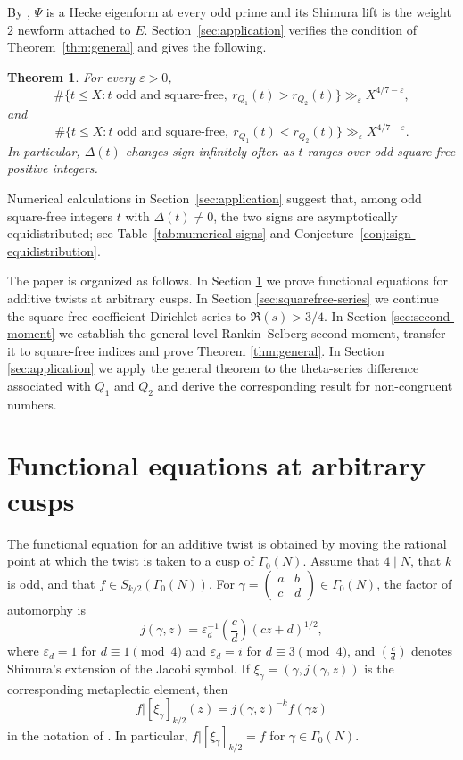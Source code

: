 \documentclass[11pt]{amsart}
\newtheorem{theorem}{Theorem}[section]
\theoremstyle{remark}
\begin{document}
By \cite{Qin}, $\Psi$ is a Hecke eigenform at every odd prime and its
Shimura lift is the weight $2$ newform attached to $E$.
Section~\ref{sec:application} verifies the condition of Theorem~\ref{thm:general} and gives the following.

\begin{theorem}\label{thm:quadratic}
For every $\varepsilon>0$,
\[
\#\{t\le X:t\text{ odd and square-free},\ r_{Q_1}(t)>r_{Q_2}(t)\}
\gg_\varepsilon X^{4/7-\varepsilon},
\]
and
\[
\#\{t\le X:t\text{ odd and square-free},\ r_{Q_1}(t)<r_{Q_2}(t)\}
\gg_\varepsilon X^{4/7-\varepsilon}.
\]
In particular, $\Delta(t)$ changes sign infinitely often as $t$ ranges over
odd square-free positive integers.
\end{theorem}

Numerical calculations in Section~\ref{sec:application} suggest that,
among odd square-free integers $t$ with $\Delta(t)\ne0$, the two signs are
asymptotically equidistributed; see Table~\ref{tab:numerical-signs} and
Conjecture~\ref{conj:sign-equidistribution}.

The paper is organized as follows. In Section \ref{sec:functional} we prove functional equations for additive twists at arbitrary cusps. In Section \ref{sec:squarefree-series} we continue the square-free coefficient Dirichlet series to $\Re(s)>3/4$. In Section \ref{sec:second-moment} we establish the general-level Rankin--Selberg second moment, transfer it to square-free indices and prove Theorem \ref{thm:general}. In Section \ref{sec:application} we apply the general theorem to the theta-series difference associated with $Q_1$ and $Q_2$ and derive the corresponding result for non-congruent numbers.

\section{Functional equations at arbitrary cusps}\label{sec:functional}
The functional equation for an additive twist is obtained by moving the
rational point at which the twist is taken to a cusp of $\Gamma_0(N)$.
 Assume that
$4\mid N$, that $k$ is odd, and that $f\in S_{k/2}(\Gamma_0(N))$. For
$\gamma=\begin{pmatrix}a&b\\c&d\end{pmatrix}\in\Gamma_0(N)$, the factor of
automorphy is
\[
j(\gamma,z)=\varepsilon_d^{-1}\left(\frac cd\right)(cz+d)^{1/2},
\]
where $\varepsilon_d=1$ for $d\equiv1\pmod4$ and $\varepsilon_d=i$ for
$d\equiv3\pmod4$, and $\left(\frac cd\right)$ denotes Shimura's extension
of the Jacobi symbol. If $\xi_\gamma=(\gamma,j(\gamma,z))$ is the
corresponding metaplectic element, then
\[
f|[\xi_\gamma]_{k/2}(z)=j(\gamma,z)^{-k}f(\gamma z)
\]
in the notation of \cite{Shimura}. In particular,
$f|[\xi_\gamma]_{k/2}=f$ for $\gamma\in\Gamma_0(N)$.
\end{document}
